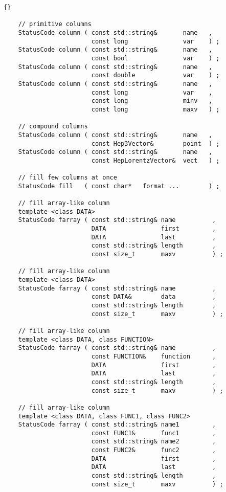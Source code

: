 \documentclass{lhcbnote}
\begin{document}
\begin{scriptsize}
  \begin{lstlisting}{}

    // primitive columns
    StatusCode column ( const std::string&       name   ,
                        const long               var    ) ;
    StatusCode column ( const std::string&       name   ,
                        const bool               var    ) ;
    StatusCode column ( const std::string&       name   ,
                        const double             var    ) ;
    StatusCode column ( const std::string&       name   ,
                        const long               var    ,
                        const long               minv   ,
                        const long               maxv   ) ;

    // compound columns
    StatusCode column ( const std::string&       name   ,
                        const Hep3Vector&        point  ) ;
    StatusCode column ( const std::string&       name   ,
                        const HepLorentzVector&  vect   ) ;

    // fill few columns at once
    StatusCode fill   ( const char*   format ...        ) ;

    // fill array-like column
    template <class DATA>
    StatusCode farray ( const std::string& name          ,
                        DATA               first         ,
                        DATA               last          ,
                        const std::string& length        ,
                        const size_t       maxv          ) ;

    // fill array-like column
    template <class DATA>
    StatusCode farray ( const std::string& name          ,
                        const DATA&        data          ,
                        const std::string& length        ,
                        const size_t       maxv          ) ;

    // fill array-like column
    template <class DATA, class FUNCTION>
    StatusCode farray ( const std::string& name          ,
                        const FUNCTION&    function      ,
                        DATA               first         ,
                        DATA               last          ,
                        const std::string& length        ,
                        const size_t       maxv          ) ;

    // fill array-like column
    template <class DATA, class FUNC1, class FUNC2>
    StatusCode farray ( const std::string& name1         ,
                        const FUNC1&       func1         ,
                        const std::string& name2         ,
                        const FUNC2&       func2         ,
                        DATA               first         ,
                        DATA               last          ,
                        const std::string& length        ,
                        const size_t       maxv          ) ;

 \end{lstlisting}
\end{scriptsize}
\end{document}
